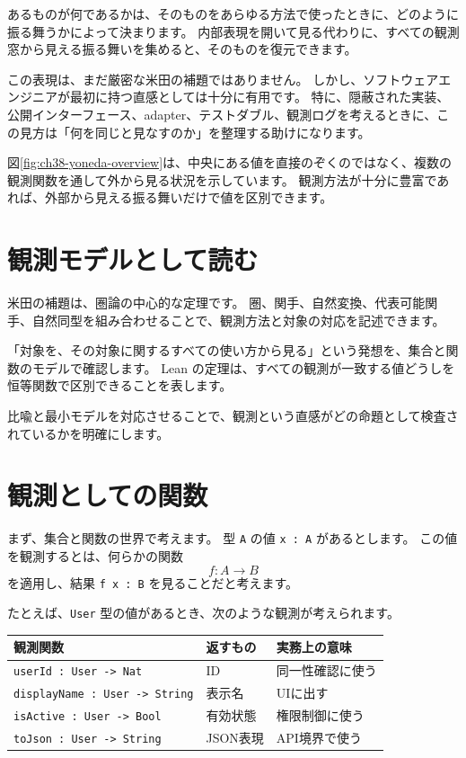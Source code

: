 あるものが何であるかは、そのものをあらゆる方法で使ったときに、どのように振る舞うかによって決まります。
内部表現を開いて見る代わりに、すべての観測窓から見える振る舞いを集めると、そのものを復元できます。

この表現は、まだ厳密な米田の補題ではありません。
しかし、ソフトウェアエンジニアが最初に持つ直感としては十分に有用です。
特に、隠蔽された実装、公開インターフェース、adapter、テストダブル、観測ログを考えるときに、この見方は「何を同じと見なすのか」を整理する助けになります。


図\ref{fig:ch38-yoneda-overview}は、中央にある値を直接のぞくのではなく、複数の観測関数を通して外から見る状況を示しています。
観測方法が十分に豊富であれば、外部から見える振る舞いだけで値を区別できます。

\section{観測モデルとして読む}

米田の補題は、圏論の中心的な定理です。
圏、関手、自然変換、代表可能関手、自然同型を組み合わせることで、観測方法と対象の対応を記述できます。

「対象を、その対象に関するすべての使い方から見る」という発想を、集合と関数のモデルで確認します。
Lean の定理は、すべての観測が一致する値どうしを恒等関数で区別できることを表します。

比喩と最小モデルを対応させることで、観測という直感がどの命題として検査されているかを明確にします。

\section{観測としての関数}

まず、集合と関数の世界で考えます。
型 \texttt{A} の値 \texttt{x : A} があるとします。
この値を観測するとは、何らかの関数
\[
  f : A \to B
\]
を適用し、結果 \texttt{f x : B} を見ることだと考えます。

たとえば、\texttt{User} 型の値があるとき、次のような観測が考えられます。

\begin{center}
\begin{tabular}{lll}
\toprule
観測関数 & 返すもの & 実務上の意味 \\
\midrule
\texttt{userId : User -> Nat} & ID & 同一性確認に使う \\
\texttt{displayName : User -> String} & 表示名 & UIに出す \\
\texttt{isActive : User -> Bool} & 有効状態 & 権限制御に使う \\
\texttt{toJson : User -> String} & JSON表現 & API境界で使う \\
\bottomrule
\end{tabular}
\end{center}

